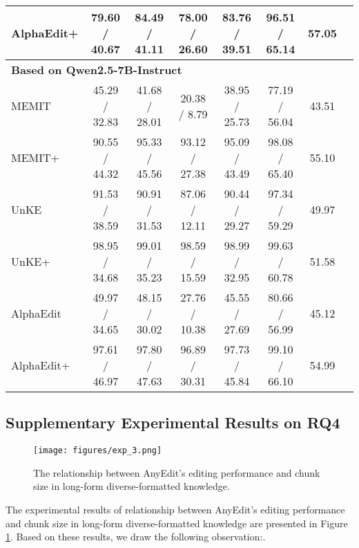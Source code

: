 \begin{table*}[h]
{\begin{tabular}{l cccc ccc}
        AlphaEdit+  & 79.60 / 40.67  & 84.49 / 41.11  & 78.00 / 26.60  & 83.76 / 39.51  & 96.51 / 65.14  & 57.05 \\
        \midrule
        \multicolumn{7}{l}{\textbf{Based on Qwen2.5-7B-Instruct}} \\
        \midrule
        MEMIT       & 45.29 / 32.83  & 41.68 / 28.01  & 20.38 / 8.79   & 38.95 / 25.73  & 77.19 / 56.04  & 43.51\\
        MEMIT+      & 90.55 / 44.32  & 95.33 / 45.56  & 93.12 / 27.38  & 95.09 / 43.49  & 98.08 / 65.40  & 55.10\\
        UnKE        & 91.53 / 38.59  & 90.91 / 31.53  & 87.06 / 12.11  & 90.44 / 29.27  & 97.34 / 59.29  & 49.97\\
        UnKE+       & 98.95 / 34.68  & 99.01 / 35.23  & 98.59 / 15.59  & 98.99 / 32.95  & 99.63 / 60.78  & 51.58\\
        AlphaEdit   & 49.97 / 34.65  & 48.15 / 30.02  & 27.76 / 10.38  & 45.55 / 27.69  & 80.66 / 56.99  & 45.12\\
        AlphaEdit+  & 97.61 / 46.97  & 97.80 / 47.63  & 96.89 / 30.31  & 97.73 / 45.84  & 99.10 / 66.10  & 54.99\\
        \bottomrule
    \end{tabular}
    }
    
\end{table*}

\subsection{Supplementary Experimental Results on RQ4}\label{app:exp_result_4}
\begin{figure}[t]
\begin{center}
\texttt{[image: figures/exp\_3.png]}
\caption{The relationship between AnyEdit's editing performance and chunk size in long-form diverse-formatted knowledge.}
\label{fig:exp_3}
\end{center}
\end{figure}


 The experimental results of relationship between AnyEdit's editing performance and chunk size in long-form diverse-formatted knowledge are presented in Figure \ref{fig:exp_3}. Based on these results, we draw the following observation:.

